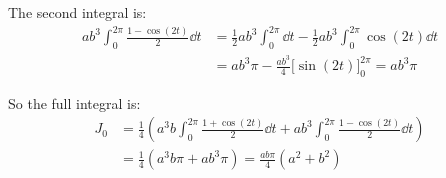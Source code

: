 \documentclass[12pt]{article}
\begin{document}
\begin{enumerate}
    The second integral is:
    \begin{align*}
        ab^3 \int_{0}^{2\pi} \frac{1 - \cos(2t)}{2} \dd t &= \frac{1}{2}ab^3 \int_{0}^{2\pi} \dd t - \frac{1}{2}ab^3 \int_{0}^{2\pi} \cos(2t) \dd t \\
        &= ab^3\pi - \frac{ab^3}{4} \big[ \sin(2t) \big]_0^{2\pi} = ab^3\pi
    \end{align*}

    So the full integral is:
    \begin{align*}
        J_0 &= \frac{1}{4} \left( a^3b \int_{0}^{2\pi} \frac{1 + \cos(2t)}{2} \dd t + ab^3 \int_{0}^{2\pi} \frac{1 - \cos(2t)}{2} \dd t \right) \\
        &= \frac{1}{4} \left( a^3b\pi + ab^3\pi\right) = \boxed{\frac{ab\pi}{4} \left( a^2 + b^2 \right)}
    \end{align*}
\end{enumerate}
\end{document}
